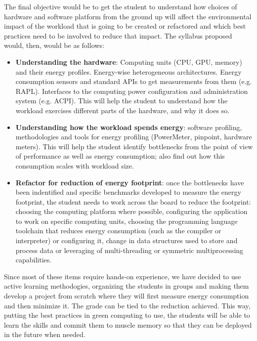 \documentclass[sigconf]{acmart}
\begin{document}
The final objective would be to get the student to understand how choices of
hardware and software platform from the ground up will affect the environmental
impact of the workload that is going to be created or refactored and which best
practices need to be involved to reduce that impact. The syllabus proposed
would, then, would be as follows:\begin{itemize}
\item {\bf Understanding the hardware}: Computing units (CPU, GPU, memory) and their energy profiles. Energy-wise
  heterogeneous architectures. Energy consumption sensors and
  standard APIs to get measurements from them (e.g. RAPL). Interfaces to the
  computing power configuration and administration system (e.g. ACPI). This will
  help the student to understand how the workload exercises different parts of
  the hardware, and why it does so.
\item {\bf Understanding how the workload spends energy}: software profiling,
  methodologies and tools for energy profiling (PowerMeter, pinpoint, hardware meters). This will help the student identify
  bottlenecks from the point of view of performance as well as energy
  consumption; also find out how this consumption scales with workload size.
\item {\bf Refactor for reduction of energy footprint}: once the bottlenecks
  have been indentified and specific benchmarks developed to measure the energy
  footprint, the student needs to work across the board to reduce the footprint:
  choosing the computing platform where possible, configuring the application to
  work on specific computing units, choosing the programming language toolchain
  that reduces energy consumption (such as the compiler or interpreter) or
  configuring it, change
  in data structures used to store and process data or leveraging of
  multi-threading or symmetric multiprocessing capabilities.
\end{itemize}

Since most of these items require hands-on experience, we have decided to use
active learning methodogies, organizing the students in groups and
making them develop a project from scratch where they will first measure energy
consumption and then minimize it. The grade can be tied to the
reduction achieved. This way, putting the best practices in green computing
to use, the students will be able to learn the skills and commit them to muscle
memory so that they can be deployed in the future when needed.



\end{document}
